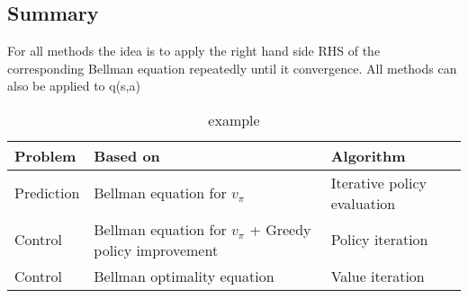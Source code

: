 \subsection{Summary}
For all methods the idea is to apply the right hand side RHS of the corresponding Bellman equation repeatedly until it convergence. All methods can also be applied to q(s,a) 

\begin{table}[ht!]
\centering
\begin{tabular}{lll}
 \textbf{Problem}& \textbf{Based on}  &\textbf{Algorithm}  \\ \hline
 Prediction& Bellman equation for $v_\pi$  &Iterative policy evaluation  \\
 Control& Bellman equation for $v_\pi$ + Greedy policy improvement  & Policy iteration \\ 
 Control& Bellman optimality equation& Value iteration \\ \hline
\end{tabular}
\caption{example}
\label{tab:tab1}
\end{table}



